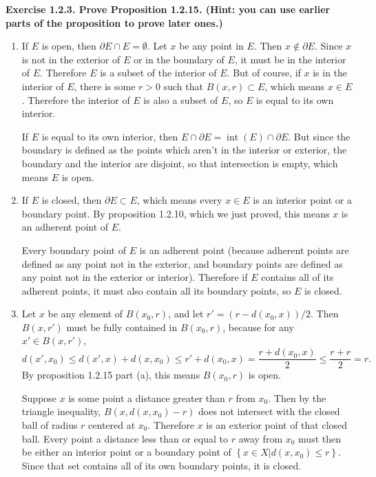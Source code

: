 \documentclass{article}
\begin{document}
\bigskip
\par
\textbf{Exercise 1.2.3. Prove Proposition 1.2.15. (Hint: you can use earlier parts of the proposition to prove later ones.)}
\begin{enumerate}[label=(\alph*)]
    \item If $E$ is open, then $\partial E \cap E = \emptyset$. Let $x$ be any point in $E$. Then $x \not\in \partial E$. Since $x$ is not in the exterior of $E$ or in the boundary of $E$, it must be in the interior of $E$. Therefore $E$ is a subset of the interior of $E$. But of course, if $x$ is in the interior of $E$, there is some $r>0$ such that $B(x, r) \subset E$, which means $x \in E$. Therefore the interior of $E$ is also a subset of $E$, so $E$ is equal to its own interior.
        \par
        If $E$ is equal to its own interior, then $E \cap \partial E = \operatorname{int}(E) \cap \partial E$. But since the boundary is defined as the points which aren't in the interior or exterior, the boundary and the interior are disjoint, so that intersection is empty, which means $E$ is open.
    \item If $E$ is closed, then $\partial E \subset E$, which means every $x \in E$ is an interior point or a boundary point. By proposition 1.2.10, which we just proved, this means $x$ is an adherent point of $E$.
        \par
        Every boundary point of $E$ is an adherent point (because adherent points are defined as any point not in the exterior, and boundary points are defined as any point not in the exterior or interior). Therefore if $E$ contains all of its adherent points, it must also contain all its boundary points, so $E$ is closed.
    \item Let $x$ be any element of $B(x_0, r)$, and let $r'=(r-d(x_0, x))/2$. Then $B(x, r')$ must be fully contained in $B(x_0, r)$, because for any $x' \in B(x, r')$,
        \[ d(x', x_0) \leq d(x', x) + d(x, x_0) \leq r' + d(x_0, x) = \frac{r+d(x_0,x)}{2} \leq \frac{r+r}{2} = r. \]
        By proposition 1.2.15 part (a), this means $B(x_0, r)$ is open.
        \par
        Suppose $x$ is some point a distance greater than $r$ from $x_0$. Then by the triangle inequality, $B(x, d(x, x_0)-r)$ does not intersect with the closed ball of radius $r$ centered at $x_0$. Therefore $x$ is an exterior point of that closed ball. Every point a distance less than or equal to $r$ away from $x_0$ must then be either an interior point or a boundary point of $ \left\{ x\in X | d(x, x_0) \leq r \right\}$. Since that set contains all of its own boundary points, it is closed.

\end{enumerate}
\end{document}
